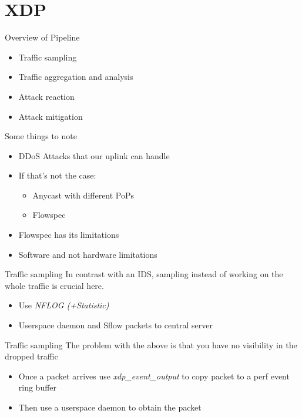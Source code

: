 \documentclass{beamer}
\begin{document}
\section{XDP}
\begin{frame}{Overview of Pipeline}
  \begin{itemize}
    \item Traffic sampling
    \item Traffic aggregation and analysis
    \item Attack reaction
    \item Attack mitigation
  \end{itemize}
\end{frame}

\begin{frame}{Some things to note}
  \begin{itemize}
    \item DDoS Attacks that our uplink can handle
    \item If that's not the case:
      \begin{itemize}
        \item Anycast with different PoPs
        \item Flowspec
      \end{itemize}
    \item Flowspec has its limitations
    \item Software and not hardware limitations
  \end{itemize}
\end{frame}

\begin{frame}{Traffic sampling}
  In contrast with an IDS, sampling instead of working on the whole traffic is crucial here.
  \begin{itemize}
    \item Use \textit{NFLOG (+Statistic)}
    \item Userspace daemon and Sflow packets to central server
  \end{itemize}
\end{frame}

\begin{frame}{Traffic sampling}
  The problem with the above is that you have no visibility in the dropped traffic
  \begin{itemize}
    \item Once a packet arrives use \textit{xdp\_event\_output} to copy packet to a perf event ring buffer
    \item Then use a userspace daemon to obtain the packet
  \end{itemize}
\end{frame}
\end{document}
